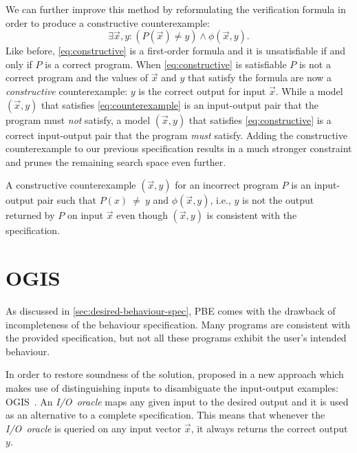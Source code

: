 We can further improve this method by reformulating the verification formula in order to produce a constructive counterexample:
%
\begin{equation}\label{eq:constructive}
\exists \vec{x}, y : (P(\vec{x}) \neq y) \wedge \phi(\vec{x}, y).
\end{equation}
%
Like before, \eqref{eq:constructive} is a first-order formula and it is unsatisfiable if and only if \(P\) is a correct program.
When \eqref{eq:constructive} is satisfiable \(P\) is not a correct program and the values of \(\vec{x}\) and \(y\) that satisfy the formula are now a \textit{constructive} counterexample: \(y\) is the correct output for input \(\vec{x}\).
While a model \((\vec{x}, y)\) that satisfies \eqref{eq:counterexample} is an input-output pair that the program must \textit{not} satisfy, a model \((\vec{x}, y)\) that satisfies \eqref{eq:constructive} is a correct input-output pair that the program \textit{must} satisfy.
Adding the constructive counterexample to our previous specification results in a much stronger constraint and prunes the remaining search space even further. %

\begin{definition}
A constructive counterexample \((\vec{x}, y)\) for an incorrect program \(P\) is an input-output pair such that {{\(P(x)~\neq~y\)}} and \(\phi(\vec{x}, y)\), i.e., \(y\) is not the output returned by \(P\) on input \(\vec{x}\) even though \((\vec{x}, y)\) is consistent with the specification.
\end{definition}

\section{\acl{OGIS}} \label{sec:ogis}
As discussed in \autoref{sec:desired-behaviour-spec}, \ac{PBE} comes with the drawback of incompleteness of the behaviour specification. Many programs are consistent with the provided specification, but not all these programs exhibit the user's intended behaviour.

In order to restore soundness of the solution, \citeauthor{DBLP:conf/icse/JhaGST10} proposed in \citeyear{DBLP:conf/icse/JhaGST10} a new approach which makes use of distinguishing inputs to disambiguate the input-output examples: \acf{OGIS}~\cite{DBLP:conf/icse/JhaGST10}.
An \textit{I/O~oracle} maps any given input to the desired output and it is used as an alternative to a complete specification. This means that whenever the \textit{I/O~oracle} is queried on any input vector \(\vec{x}\), it always returns the correct output \(y\).

